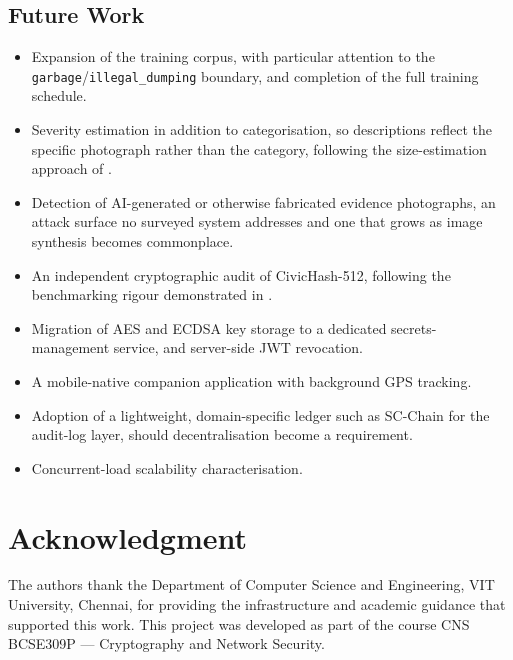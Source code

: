 \documentclass[conference]{IEEEtran}
\begin{document}
\subsection{Future Work}
\begin{itemize}
\item Expansion of the training corpus, with particular attention to the \texttt{garbage}/\texttt{illegal\_dumping} boundary, and completion of the full training schedule.
\item Severity estimation in addition to categorisation, so descriptions reflect the specific photograph rather than the category, following the size-estimation approach of \cite{l2enhancedyolo}.
\item Detection of AI-generated or otherwise fabricated evidence photographs, an attack surface no surveyed system addresses and one that grows as image synthesis becomes commonplace.
\item An independent cryptographic audit of CivicHash-512, following the benchmarking rigour demonstrated in \cite{l19ecdsabenchmark}.
\item Migration of AES and ECDSA key storage to a dedicated secrets-management service, and server-side JWT revocation.
\item A mobile-native companion application with background GPS tracking.
\item Adoption of a lightweight, domain-specific ledger such as SC-Chain \cite{l16scchain} for the audit-log layer, should decentralisation become a requirement.
\item Concurrent-load scalability characterisation.
\end{itemize}

\section*{Acknowledgment}
The authors thank the Department of Computer Science and Engineering, VIT University, Chennai, for providing the infrastructure and academic guidance that supported this work. This project was developed as part of the course CNS BCSE309P --- Cryptography and Network Security.
\end{document}

